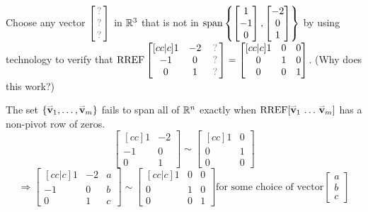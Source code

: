 \begin{activity}{15}
  Choose any vector \(\begin{bmatrix}\unknown\\\unknown\\\unknown\end{bmatrix}\)
  in \(\mathbb{R}^3\) that is not in
  \(\operatorname{span}\left\{\begin{bmatrix}1\\-1\\0\end{bmatrix},
  \begin{bmatrix}-2\\0\\1\end{bmatrix}\right\}\) by using technology to verify that
  \(
    \RREF
    \begin{bmatrix}[cc|c]1&-2&\unknown\\-1&0&\unknown\\0&1&\unknown\end{bmatrix}
      =
    \begin{bmatrix}[cc|c]1&0&0\\0&1&0\\0&0&1\end{bmatrix}
  \).
  (Why does this work?)
\end{activity}

\begin{fact}
  The set \(\{\mathbf{\accentset{\rightharpoonup}{v}}_1,\dots,\mathbf{\accentset{\rightharpoonup}{v}}_m\}\) fails to span all of \(\mathbb{R}^n\)
  exactly when \(\operatorname{RREF}[\mathbf{\accentset{\rightharpoonup}{v}}_1\,\dots\,\mathbf{\accentset{\rightharpoonup}{v}}_m]\) has a non-pivot row of zeros.
  \[\begin{bmatrix}[cc]1&-2\\-1&0\\0&1\end{bmatrix}\sim
  \begin{bmatrix}[cc]1&0\\0&1\\0&0\end{bmatrix}\]
  \[\Rightarrow
  \begin{bmatrix}[cc|c]1&-2&a\\-1&0&b\\0&1&c\end{bmatrix}\sim
  \begin{bmatrix}[cc|c]1&0&0\\0&1&0\\0&0&1\end{bmatrix}
  \text{for some choice of vector} \begin{bmatrix} a \\ b \\ c \end{bmatrix} \]
\end{fact}

